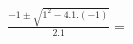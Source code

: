 \documentclass[preview]{standalone}
\begin{document}
\begin{align*}
\frac{-1 \pm \sqrt{1^2 - 4.1.(-1)}}{2.1}=
\end{align*}
\end{document}
